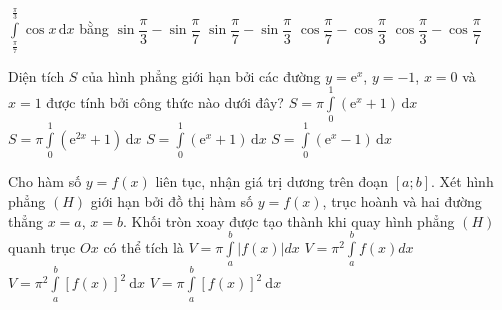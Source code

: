 
\begin{ex}%
	$\displaystyle\int\limits_{\tfrac{\pi}{7}}^{\tfrac{\pi}{3}} \cos x \mathrm{\,d}x$ bằng
	\choice
	{\True $\sin\dfrac{\pi}{3}-\sin\dfrac{\pi}{7}$}
	{$\sin\dfrac{\pi}{7}-\sin\dfrac{\pi}{3}$}
	{$\cos\dfrac{\pi}{7}-\cos\dfrac{\pi}{3}$}
	{$\cos\dfrac{\pi}{3}-\cos\dfrac{\pi}{7}$}
\end{ex}

\begin{ex}%
	Diện tích $S$ của hình phẳng giới hạn bởi các đường $y=\mathrm{e}^x$, $y=-1$, $x=0$ và $x=1$ được tính bởi công thức nào dưới đây?
	\choice
	{$S=\pi\displaystyle\int\limits_0^1(\mathrm{e}^x+1)\mathrm{\,d}x$}
	{$S=\pi\displaystyle\int\limits_0^1(\mathrm{e}^{2x}+1)\mathrm{\,d}x$}
	{\True $S=\displaystyle\int\limits_0^1(\mathrm{e}^x+1)\mathrm{\,d}x$}
	{$S=\displaystyle\int\limits_0^1(\mathrm{e}^x-1)\mathrm{\,d}x$}
\end{ex}

%

\begin{ex}%
	Cho hàm số $y=f(x)$ liên tục, nhận giá trị dương trên đoạn $[a; b]$. Xét hình phẳng $(H)$ giới hạn bởi đồ thị hàm số $y=f(x)$, trục hoành và hai đường thẳng $x=a$, $x=b$. Khối tròn xoay được tạo thành khi quay hình phẳng $(H)$ quanh trục $Ox$ có thể tích là
	\choice
	{$V=\pi \displaystyle\int\limits_a^b|f(x)|d x$}
	{$V=\pi^2\displaystyle\int\limits_a^b f(x) d x$}
	{$V=\pi^2\displaystyle\int\limits_a^b[f(x)]^2\mathrm{~d} x$}
	{\True $V=\pi \displaystyle\int\limits_a^b[f(x)]^2\mathrm{~d} x$}
\end{ex}

